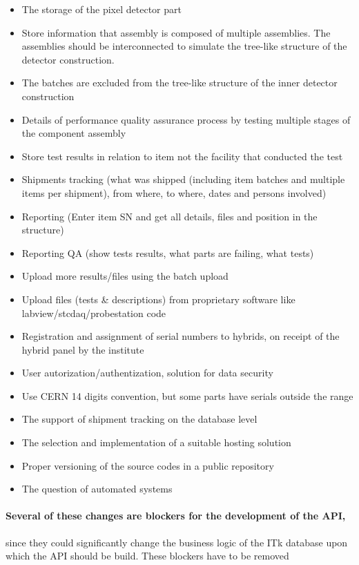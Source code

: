 \begin{itemize}
\item The storage of the pixel detector part
\item Store information that assembly is composed of multiple assemblies. The assemblies should be interconnected to simulate the tree-like structure of the detector construction. 
\item The batches are excluded from the tree-like structure of the inner detector construction
\item Details of performance quality assurance process by testing multiple stages of the component assembly
\item Store test results	 in relation to item not the facility that conducted the test
\item Shipments tracking (what was shipped (including item batches and multiple items per shipment), from where, to where, dates and persons involved)
\item Reporting (Enter item SN and get all details, files and position in the structure)
\item Reporting QA (show tests results, what parts are failing, what tests)
\item Upload more results/files using the batch upload
\item Upload files (tests \& descriptions) from proprietary software like labview/stcdaq/probestation code
\item Registration and assignment of serial numbers to hybrids, on receipt of the hybrid panel by the institute
\item User autorization/authentization, solution for data security
\item Use CERN 14 digits convention, but some parts have serials outside the range
\item The support of shipment tracking on the database level
\item The selection and implementation of a suitable hosting solution
\item Proper versioning of the source codes in a public repository
\item The question of automated systems
\end{itemize}

\paragraph{Several of these changes are blockers for the development of the API,} since they could significantly change the business logic of the ITk database upon which the API should be build. These blockers have to be removed %

